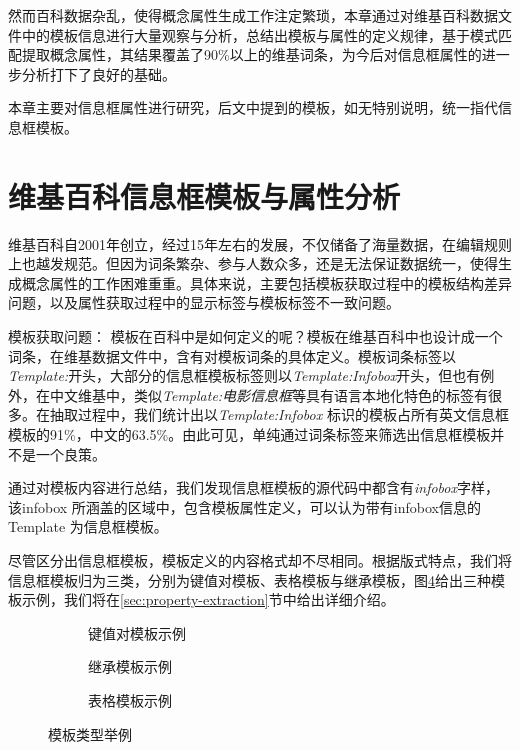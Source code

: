 然而百科数据杂乱，使得概念属性生成工作注定繁琐，本章通过对维基百科数据文件中的模板信息进行大量观察与分析，总结出模板与属性的定义规律，基于模式匹配提取概念属性，其结果覆盖了90\%以上的维基词条，为今后对信息框属性的进一步分析打下了良好的基础。

本章主要对信息框属性进行研究，后文中提到的模板，如无特别说明，统一指代{\heiti 信息框模板}。

\section{维基百科信息框模板与属性分析}
\label{sec:template-analysis}

维基百科自2001年创立，经过15年左右的发展，不仅储备了海量数据，在编辑规则上也越发规范。但因为词条繁杂、参与人数众多，还是无法保证数据统一，使得生成概念属性的工作困难重重。具体来说，主要包括模板获取过程中的模板结构差异问题，以及属性获取过程中的显示标签与模板标签不一致问题。

{\heiti 模板获取问题：}
模板在百科中是如何定义的呢？模板在维基百科中也设计成一个词条，在维基数据文件中，含有对模板词条的具体定义。模板词条标签以\textit{Template:}开头，大部分的信息框模板标签则以\textit{Template:Infobox}开头，但也有例外，在中文维基中，类似\textit{Template:电影信息框}等具有语言本地化特色的标签有很多。在抽取过程中，我们统计出以\textit{Template:Infobox} 标识的模板占所有英文信息框模板的91\%，中文的63.5\%。由此可见，单纯通过词条标签来筛选出信息框模板并不是一个良策。

通过对模板内容进行总结，我们发现信息框模板的源代码中都含有\textit{infobox}字样，该infobox 所涵盖的区域中，包含模板属性定义，可以认为带有infobox信息的Template 为信息框模板。

尽管区分出信息框模板，模板定义的内容格式却不尽相同。根据版式特点，我们将信息框模板归为三类，分别为键值对模板、表格模板与继承模板，图\ref{fig:template-examples}给出三种模板示例，我们将在\ref{sec:property-extraction}节中给出详细介绍。

\begin{figure}[ht]
\centering
    \begin{subfigure}{7.2cm}
        \centering
        \caption{键值对模板示例}
        \label{fig:template-keyvalue}
    \end{subfigure}
    \hspace{0.01cm}
    \begin{subfigure}{7.2cm}
        \centering
        \caption{继承模板示例}
        \label{fig:template-inherit}
    \end{subfigure}
    \vspace{0.01cm}
    \begin{subfigure}{9.6cm}
        \centering
        \caption{表格模板示例}
        \label{fig:template-table}
    \end{subfigure}
\caption{模板类型举例}
\label{fig:template-examples}
\end{figure}

